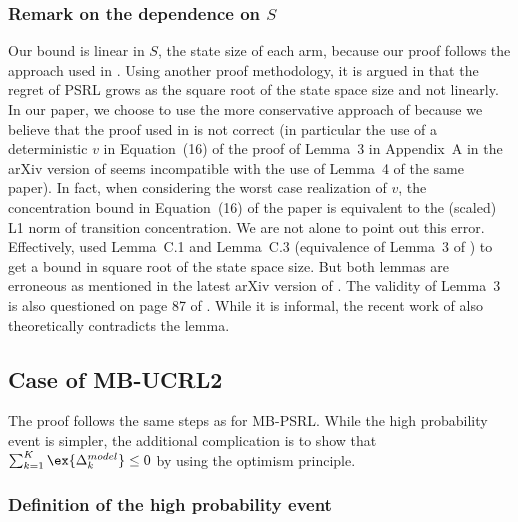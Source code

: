 \begin{subappendices}
\subsubsection{Remark on the dependence on $S$}
\label{sssec:psrl_s}

Our bound is linear in $S$, the state size of each arm, because our proof follows the approach used in \cite{osband2013more}. Using another proof methodology, it is argued in \cite{osband2017posterior} that the regret of PSRL grows as the square root of the state space size and not linearly. In our paper, we choose to use the more conservative approach of \cite{osband2013more} because we believe that the proof used in \cite{osband2017posterior} is not correct (in particular the use of a deterministic $v$ in Equation~(16) of the proof of Lemma~3 in Appendix~A in the arXiv version of \cite{osband2017posterior} seems incompatible with the use of Lemma~4 of the same paper).
In fact, when considering the worst case realization of $v$, the concentration bound in Equation~(16) of the paper is equivalent to the (scaled) L1 norm of transition concentration.
We are not alone to point out this error. Effectively, \cite{agrawal2017posterior} used Lemma~C.1 and Lemma~C.3 (equivalence of Lemma~3 of \cite{osband2017posterior}) to get a bound in square root of the state space size. But both lemmas are erroneous as mentioned in the latest arXiv version of \cite{agrawal2017posterior}. The validity of Lemma~3 is also questioned on page 87 of \cite{fruit2019exploration}. While it is informal, the recent work of \cite{qian2020concentration} also theoretically contradicts the lemma.

\subsection{Case of MB-UCRL2}
\label{ssec:proof_UCRL2}

The proof follows the same steps as for MB-PSRL. While the high probability event is simpler, the additional complication is to show that $\sum_{k=1}^K\ex{\Delta^{model}_k}\le0$ by using the optimism principle. 

\subsubsection{Definition of the high probability event} 


\end{subappendices}
